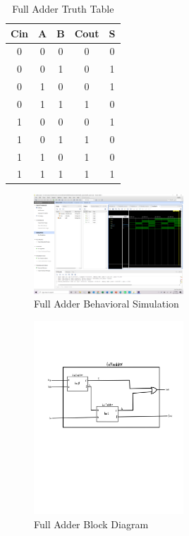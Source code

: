 \documentclass[11pt]{article}
\begin{document}
\begin{table}[h]\centering
	\caption{Full Adder Truth Table }
	\label{tbl:example_table}
	\begin{tabular}{ccc|cc}
		\toprule
		Cin & A & B & Cout & S \\
		\midrule
		0 & 0 & 0 & 0 & 0 \\
		0 & 0 & 1 & 0 & 1 \\
		0 & 1 & 0 & 0 & 1 \\
		0 & 1 & 1 & 1 & 0 \\
		1 & 0 & 0 & 0 & 1 \\
		1 & 0 & 1 & 1 & 0 \\
		1 & 1 & 0 & 1 & 0 \\
		1 & 1 & 1 & 1 & 1 \\
		\bottomrule
	\end{tabular} 
\end{table}

\begin{figure}[h]\centering
	\includegraphics[width=0.5\textwidth,trim=43cm 30cm 0cm 8cm,clip]{fulladder sim}
	\caption{Full Adder Behavioral Simulation}
\end{figure}

\begin{figure}[h]\centering
	\includegraphics[width=0.5\textwidth,trim=0cm 25cm 0cm 10cm,clip]{fulladder block diagram}
	\caption{Full Adder Block Diagram}
\end{figure}
\end{document}
